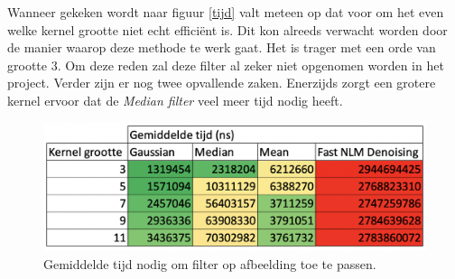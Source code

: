 Wanneer gekeken wordt naar figuur \ref{tijd} valt meteen op dat  voor om het even welke kernel grootte niet echt efficiënt is. Dit kon alreeds verwacht worden door de manier waarop deze methode te werk gaat. Het is trager met een orde van grootte 3. Om deze reden zal deze filter al zeker niet opgenomen worden in het project. Verder zijn er nog twee opvallende zaken. Enerzijds zorgt een grotere kernel ervoor dat de \textit{Median filter} veel meer tijd nodig heeft.
\begin{figure}[h]
    \centering
    \includegraphics[scale=0.5]{img/tijdsconsumptie}
    \caption{Gemiddelde tijd nodig om filter op afbeelding toe te passen.}
    \label{fig:tijd}
\end{figure}